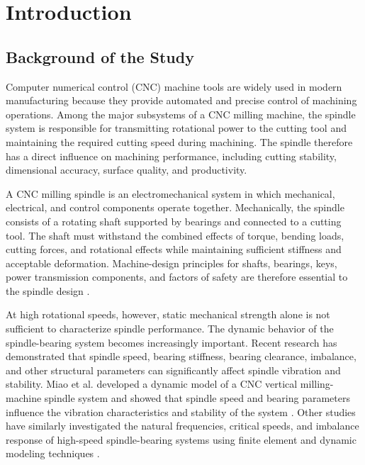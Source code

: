 \documentclass[12pt,a4paper]{report}
\begin{document}
	\tableofcontents
	\listoffigures
	\listoftables
	
	\chapter{Introduction}
	
	\section{Background of the Study}
	Computer numerical control (CNC) machine tools are widely used in modern manufacturing because they provide automated and precise control of machining operations. Among the major subsystems of a CNC milling machine, the spindle system is responsible for transmitting rotational power to the cutting tool and maintaining the required cutting speed during machining. The spindle therefore has a direct influence on machining performance, including cutting stability, dimensional accuracy, surface quality, and productivity.
	
	A CNC milling spindle is an electromechanical system in which mechanical, electrical, and control components operate together. Mechanically, the spindle consists of a rotating shaft supported by bearings and connected to a cutting tool. The shaft must withstand the combined effects of torque, bending loads, cutting forces, and rotational effects while maintaining sufficient stiffness and acceptable deformation. Machine-design principles for shafts, bearings, keys, power transmission components, and factors of safety are therefore essential to the spindle design \cite{ref1,ref2,ref3}.
	
	At high rotational speeds, however, static mechanical strength alone is not sufficient to characterize spindle performance. The dynamic behavior of the spindle-bearing system becomes increasingly important. Recent research has demonstrated that spindle speed, bearing stiffness, bearing clearance, imbalance, and other structural parameters can significantly affect spindle vibration and stability. Miao et al. developed a dynamic model of a CNC vertical milling-machine spindle system and showed that spindle speed and bearing parameters influence the vibration characteristics and stability of the system \cite{ref11}. Other studies have similarly investigated the natural frequencies, critical speeds, and imbalance response of high-speed spindle-bearing systems using finite element and dynamic modeling techniques \cite{ref12}.
	
\end{document}
